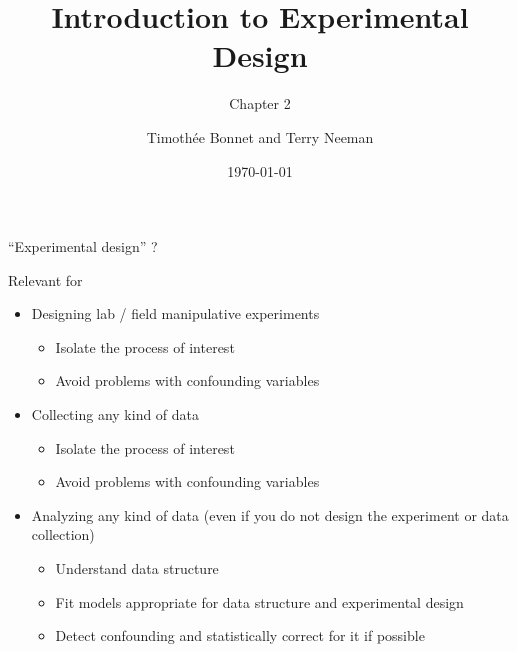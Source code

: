 \documentclass[10pt]{beamer}
\title{Introduction to Experimental Design}
\subtitle{Chapter 2}
\author{Timoth\'ee Bonnet and Terry Neeman}
\date{\today}
\begin{document}



\begin{frame}{}
\maketitle

\end{frame}

\begin{frame}{``Experimental design'' ?}
 
 \begin{exampleblock}{Relevant for}
  \begin{itemize}[<+->]
   \item Designing lab / field manipulative experiments
      \begin{itemize}
       \item Isolate the process of interest
       \item Avoid problems with confounding variables
      \end{itemize}
   \item Collecting any kind of data 
   \begin{itemize}
       \item Isolate the process of interest
       \item Avoid problems with confounding variables
      \end{itemize}
   \item Analyzing any kind of data (even if you do not design the experiment or data collection)
      \begin{itemize}
       \item Understand data structure
       \item Fit models appropriate for data structure and experimental design
       \item Detect confounding and statistically correct for it if possible
      \end{itemize}

  \end{itemize}  
 \end{exampleblock}

 
\end{frame}
\end{document}
